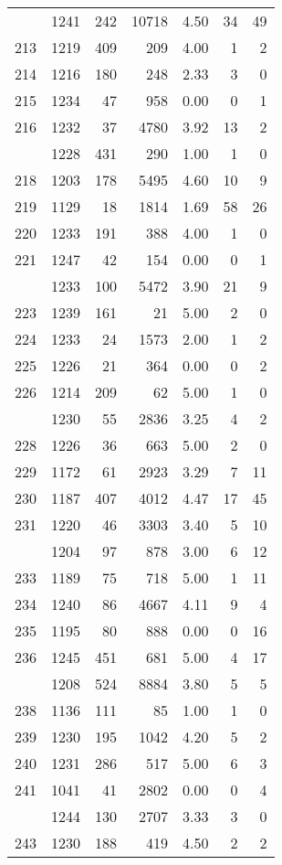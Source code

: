 \documentclass[
]{article}
\begin{document}
\begin{table}
\begin{tabular}[t]{lrrrrrr}
\addlinespace
212 & 1241 & 242 & 10718 & 4.50 & 34 & 49\\
213 & 1219 & 409 & 209 & 4.00 & 1 & 2\\
214 & 1216 & 180 & 248 & 2.33 & 3 & 0\\
215 & 1234 & 47 & 958 & 0.00 & 0 & 1\\
216 & 1232 & 37 & 4780 & 3.92 & 13 & 2\\
\addlinespace
217 & 1228 & 431 & 290 & 1.00 & 1 & 0\\
218 & 1203 & 178 & 5495 & 4.60 & 10 & 9\\
219 & 1129 & 18 & 1814 & 1.69 & 58 & 26\\
220 & 1233 & 191 & 388 & 4.00 & 1 & 0\\
221 & 1247 & 42 & 154 & 0.00 & 0 & 1\\
\addlinespace
222 & 1233 & 100 & 5472 & 3.90 & 21 & 9\\
223 & 1239 & 161 & 21 & 5.00 & 2 & 0\\
224 & 1233 & 24 & 1573 & 2.00 & 1 & 2\\
225 & 1226 & 21 & 364 & 0.00 & 0 & 2\\
226 & 1214 & 209 & 62 & 5.00 & 1 & 0\\
\addlinespace
227 & 1230 & 55 & 2836 & 3.25 & 4 & 2\\
228 & 1226 & 36 & 663 & 5.00 & 2 & 0\\
229 & 1172 & 61 & 2923 & 3.29 & 7 & 11\\
230 & 1187 & 407 & 4012 & 4.47 & 17 & 45\\
231 & 1220 & 46 & 3303 & 3.40 & 5 & 10\\
\addlinespace
232 & 1204 & 97 & 878 & 3.00 & 6 & 12\\
233 & 1189 & 75 & 718 & 5.00 & 1 & 11\\
234 & 1240 & 86 & 4667 & 4.11 & 9 & 4\\
235 & 1195 & 80 & 888 & 0.00 & 0 & 16\\
236 & 1245 & 451 & 681 & 5.00 & 4 & 17\\
\addlinespace
237 & 1208 & 524 & 8884 & 3.80 & 5 & 5\\
238 & 1136 & 111 & 85 & 1.00 & 1 & 0\\
239 & 1230 & 195 & 1042 & 4.20 & 5 & 2\\
240 & 1231 & 286 & 517 & 5.00 & 6 & 3\\
241 & 1041 & 41 & 2802 & 0.00 & 0 & 4\\
\addlinespace
242 & 1244 & 130 & 2707 & 3.33 & 3 & 0\\
243 & 1230 & 188 & 419 & 4.50 & 2 & 2\\

\end{tabular}
\end{table}
\end{document}
